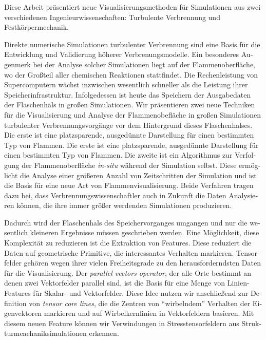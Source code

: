 \begin{otherlanguage}{german}%
%
Diese Arbeit pr\"asentiert neue Visualisierungsmethoden f\"ur Simulationen aus
zwei verschiedenen Ingenieurwissenschaften: Turbulente Verbrennung und
Festk\"orpermechanik.
%

%
Direkte numerische Simulationen turbulenter Verbrennung sind eine Basis f\"ur
die Entwicklung und Validierung h\"oherer Verbrenungsmodelle.
%
Ein besonderes Augenmerk bei der Analyse solcher Simulationen liegt auf der
Flammenoberfl\"ache, wo der Gro\ss{}teil aller chemischen Reaktionen stattfindet.
%
Die Rechenleistung von Supercomputern w\"achst inzwischen wesentlich schneller als
die Leistung ihrer Speicherinfrastruktur.
%
Infolgedessen ist heute das Speichern der Ausgabedaten der Flaschenhals in
gro\ss{}en Simulationen.
%
Wir pr\"asentieren zwei neue Techniken f\"ur die Visualisierung und Analyse der
Flammenobefl\"ache in gro\ss{}en Simulationen turbulenter Verbrennungsvorg\"ange
vor dem Hintergrund dieses Flaschenhalses.
%
Die erste ist eine platzsparende, ausged\"unnte Darstellung f\"ur einen
bestimmten Typ von Flammen.
%
Die erste ist eine platzsparende, ausged\"unnte Darstellung f\"ur einen
bestimmten Typ von Flammen.
%
Die zweite ist ein Algorithmus zur Verfolgung der Flammenoberfl\"ache
\emph{in-situ} w\"ahrend der Simulation selbst.
%
Diese erm\"oglicht die Analyse einer gr\"o\ss{}eren Anzahl von Zeitschritten der
Simulation und ist die Basis f\"ur eine neue Art von Flammenvisualisierung.
%
Beide Verfahren tragen dazu bei, dass Verbrennungswissenschaftler auch in
Zukunft die Daten Analysieren k\"onnen, die ihre immer gr\"o\ss{}er werdenden
Simulationen produzieren.
%

%
Dadurch wird der Flaschenhals des Speichervorganges umgangen und nur die
wesentlich kleineren Ergebnisse m\"ussen geschrieben werden.
%
Eine M\"oglichkeit, diese Komplexit\"at zu reduzieren ist die Extraktion von
Features.
%
Diese reduziert die Daten auf geometrische Primitive, die interessantes
Verhalten markieren.
%
Tensorfelder geh\"oren wegen ihrer vielen Freiheitsgrade zu den
herausforderndsten Daten f\"ur die Visualisierung.
%
Der \emph{parallel vectors operator}, der alle Orte bestimmt an denen zwei
Vektorfelder parallel sind, ist die Basis f\"ur eine Menge von Linien- Features
f\"ur Skalar- und Vektorfelder.
%
Diese Idee nutzen wir anschlie\ss{}end zur Definition von \emph{tensor core lines},
die die Zentren von ``wirbelndem'' Verhalten der Eigenvektoren markieren und
auf Wirbelkernlinien in Vektorfeldern basieren.
%
Mit diesem neuen Feature k\"onnen wir Verwindungen in Stresstensorfeldern aus
Strukturmeachaniksimulationen erkennen.
%
\end{otherlanguage}%